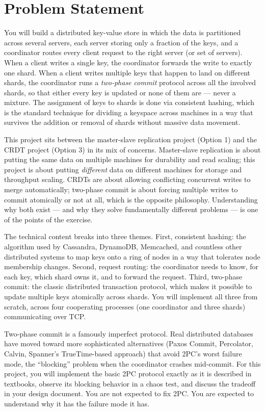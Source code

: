 \documentclass[11pt,a4paper]{article}
\begin{document}

\section{Problem Statement}

You will build a distributed key-value store in which the data is partitioned across several servers, each server storing only a fraction of the keys, and a coordinator routes every client request to the right server (or set of servers). When a client writes a single key, the coordinator forwards the write to exactly one shard. When a client writes multiple keys that happen to land on different shards, the coordinator runs a \textit{two-phase commit} protocol across all the involved shards, so that either every key is updated or none of them are --- never a mixture. The assignment of keys to shards is done via consistent hashing, which is the standard technique for dividing a keyspace across machines in a way that survives the addition or removal of shards without massive data movement.

This project sits between the master-slave replication project (Option 1) and the CRDT project (Option 3) in its mix of concerns. Master-slave replication is about putting the same data on multiple machines for durability and read scaling; this project is about putting \textit{different} data on different machines for storage and throughput scaling. CRDTs are about allowing conflicting concurrent writes to merge automatically; two-phase commit is about forcing multiple writes to commit atomically or not at all, which is the opposite philosophy. Understanding why both exist --- and why they solve fundamentally different problems --- is one of the points of the exercise.

The technical content breaks into three themes. First, consistent hashing: the algorithm used by Cassandra, DynamoDB, Memcached, and countless other distributed systems to map keys onto a ring of nodes in a way that tolerates node membership changes. Second, request routing: the coordinator needs to know, for each key, which shard owns it, and to forward the request. Third, two-phase commit: the classic distributed transaction protocol, which makes it possible to update multiple keys atomically across shards. You will implement all three from scratch, across four cooperating processes (one coordinator and three shards) communicating over TCP.

Two-phase commit is a famously imperfect protocol. Real distributed databases have moved toward more sophisticated alternatives (Paxos Commit, Percolator, Calvin, Spanner's TrueTime-based approach) that avoid 2PC's worst failure mode, the ``blocking'' problem when the coordinator crashes mid-commit. For this project, you will implement the basic 2PC protocol exactly as it is described in textbooks, observe its blocking behavior in a chaos test, and discuss the tradeoff in your design document. You are not expected to fix 2PC. You are expected to understand why it has the failure mode it has.
\end{document}
